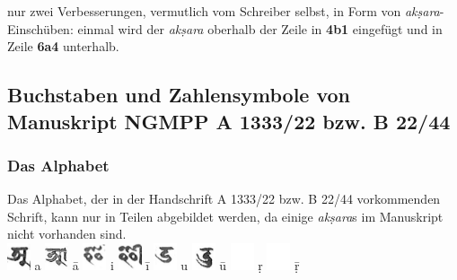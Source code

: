 \documentclass[a4paper,12pt]{article}
\begin{document}
{nur zwei Verbesserungen, vermutlich vom Schreiber selbst, in Form von \textit{akṣara}-Einschüben: einmal wird der \textit{akṣara} oberhalb der Zeile in \textbf{4b1} eingefügt und in Zeile \textbf{6a4} unterhalb.  

\subsection{Buchstaben und Zahlensymbole von Manuskript NGMPP A 1333/22 bzw. B 22/44}
\subsubsection{Das Alphabet}

Das Alphabet, der in der Handschrift  A 1333/22 bzw. B 22/44 vorkommenden Schrift, kann nur in Teilen abgebildet werden, da einige \textit{akṣara}s im Manuskript nicht vorhanden sind.
\linebreak
 \\
\noindent
\includegraphics[height=8.0mm]{a.jpg} a  \includegraphics[height=8.0mm]{aa.jpg} ā \includegraphics[height=8.0mm]{i.jpg} i \includegraphics[height=8.0mm]{ii.jpg} ī
\includegraphics[height=8.0mm]{u.jpg} u  \includegraphics[height=8.0mm]{uu.jpg} ū \includegraphics[height=8.0mm]{white.jpg} ṛ \includegraphics[height=8.0mm]{white.jpg} ṝ \\
}
\end{document}
